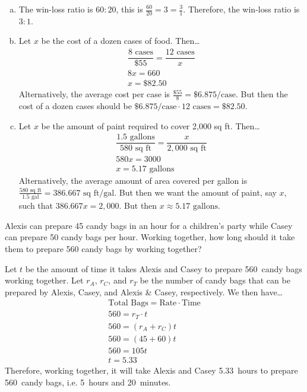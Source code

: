 \documentclass[11pt,letterpaper]{article}
\begin{document}
\sol 
\begin{enumerate}[(a)]
\item The win-loss ratio is $60 : 20$, this is $\frac{60}{20}= 3= \frac{3}{1}$. Therefore, the win-loss ratio is $3 : 1$. \pspace

\item Let $x$ be the cost of a dozen cases of food. Then\dots
	\[
	\begin{gathered}
	\dfrac{8 \text{ cases}}{\$55}= \dfrac{12 \text{ cases}}{x} \\[0.3cm]
	8x= 660 \\[0.3cm]
	x= \$82.50
	\end{gathered}
	\]
Alternatively, the average cost per case is $\frac{\$55}{8}= \$6.875 \text{/case}$. But then the cost of a dozen cases should be $\$6.875 \text{/case} \cdot 12 \text{ cases}= \$82.50$. \pspace

\item Let $x$ be the amount of paint required to cover 2,000 sq ft. Then\dots
	\[
	\begin{gathered}
	\dfrac{1.5 \text{ gallons}}{580 \text{ sq ft}}= \dfrac{x}{2,\!000 \text{ sq ft}} \\[0.3cm]
	580x= 3000 \\[0.3cm]
	x= 5.17 \text{ gallons}
	\end{gathered}
	\]
Alternatively, the average amount of area covered per gallon is $\frac{580 \text{ sq ft}}{1.5 \text{ gal}}= 386.667 \text{ sq ft/gal}$. But then we want the amount of paint, say $x$, such that $386.667x= 2,\!000$. But then $x \approx 5.17 \text{ gallons}$. 
\end{enumerate}



\newpage



 Alexis can prepare 45 candy bags in an hour for a children's party while Casey can prepare 50 candy bags per hour. Working together, how long should it take them to prepare 560 candy bags by working together? \pspace

\sol Let $t$ be the amount of time it takes Alexis and Casey to prepare 560~candy bags working together. Let $r_A$, $r_C$, and $r_T$ be the number of candy bags that can be prepared by Alexis, Casey, and Alexis \& Casey, respectively. We then have\dots
	\[
	\begin{gathered}
	\text{Total Bags}= \text{Rate} \cdot \text{Time} \\[0.3cm]
	560= r_T \cdot t \\[0.3cm]
	560= (r_A + r_C) t \\[0.3cm]
	560= (45 + 60)t \\[0.3cm]
	560= 105t \\[0.3cm]
	t= 5.33
	\end{gathered}
	\]
Therefore, working together, it will take Alexis and Casey 5.33~hours to prepare 560~candy bags, i.e. 5~hours and 20~minutes. 
\end{document}

